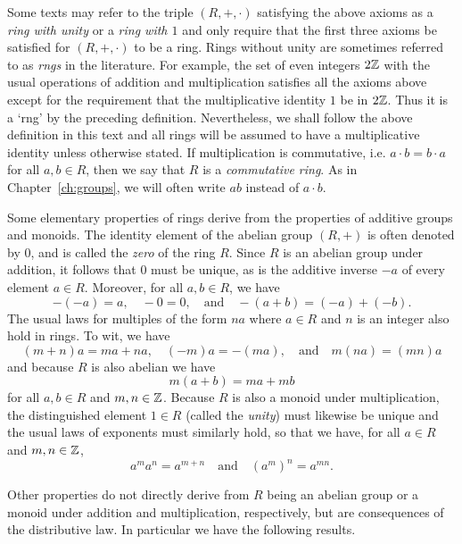 Some texts may refer to the triple \((R, +, \cdot)\) satisfying the above axioms
as a \emph{ring with unity} or a \emph{ring with \(1\)} and only require that
the first three axioms be satisfied for \((R, +, \cdot)\) to be a ring. Rings
without unity are sometimes referred to as \emph{rngs} in the literature. For
example, the set of even integers \(2\mathbb{Z}\) with the usual operations of addition
and multiplication satisfies all the axioms above except for the requirement
that the multiplicative identity \(1\) be in \(2\mathbb{Z}\). Thus it is a `rng' by the
preceding definition. Nevertheless, we shall follow the above definition in this
text and all rings will be assumed to have a multiplicative identity unless
otherwise stated. If multiplication is commutative, i.e. \(a \cdot b = b \cdot
a\) for all \(a, b \in R\), then we say that \(R\) is a \emph{commutative ring}.
As in Chapter~\ref{ch:groups}, we will often write \(ab\) instead of \(a \cdot
b\).

Some elementary properties of rings derive from the properties of additive
groups and monoids. The identity element of the abelian group \((R, +)\) is
often denoted by \(0\), and is called the \emph{zero} of the ring \(R\). Since
\(R\) is an abelian group under addition, it follows that \(0\) must be unique,
as is the additive inverse \(-a\) of every element \(a \in R\). Moreover, for
all \(a, b \in R\), we have
\[
    -(-a) = a, \quad -0 = 0, \quad \text{and} \quad -(a + b) = (-a) + (-b).
\]
The usual laws for multiples of the form \(na\) where \(a \in R\) and \(n\) is
an integer also hold in rings. To wit, we have
\[
    (m+n)a = ma + na, \quad (-m)a = -(ma), \quad \text{and} \quad m(na) = (mn)a
\]
and because \(R\) is also abelian we have
\[
    m(a+b) = ma + mb
\]
for all \(a, b \in R\) and \(m, n \in \mathbb{Z}\). Because \(R\) is also a monoid under
multiplication, the distinguished element \(1 \in R\) (called the \emph{unity})
must likewise be unique and the usual laws of exponents must similarly hold, so
that we have, for all \(a \in R\) and \(m, n \in \mathbb{Z}\),
\[
    a^m a^n = a^{m+n} \quad \text{and} \quad (a^m)^n = a^{mn}.
\]

Other properties do not directly derive from \(R\) being an abelian group or a
monoid under addition and multiplication, respectively, but are consequences of
the distributive law. In particular we have the following results.


